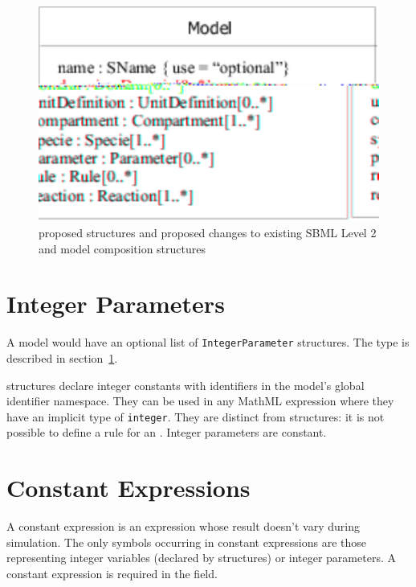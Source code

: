 \documentclass{cekarticle}
\begin{document}
\begin{figure}[h]
  \vspace*{8pt}
  \centering
  \includegraphics[scale = 0.7]{model}
  \caption{proposed structures and proposed changes to existing SBML Level 2 and model composition structures}
  \label{fig:model}
\end{figure}

\section{Integer Parameters}
\label{sec:integerParameters}

A model would have an optional list of
\texttt{IntegerParameter} structures.
The  type is described in section~\ref{sec:integerParameters}.

 structures declare integer constants with identifiers in the model's global identifier namespace.
They can be used in any MathML expression where they have an implicit type of \texttt{integer}.
They are distinct from  structures: it is not possible to define a rule for an .
Integer parameters are constant.

\section{Constant Expressions}
\label{sec:constantExpressions}

A constant expression is an expression whose result doesn't vary during simulation.
The only symbols occurring in constant expressions are those representing integer variables (declared by  structures)
or integer parameters.  A constant expression is required in the  field.
\end{document}
